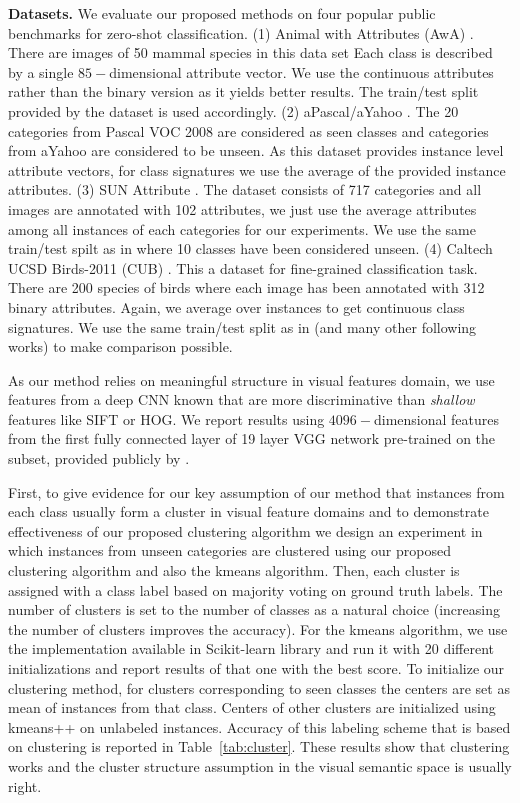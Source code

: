 \documentclass[10pt,twocolumn,letterpaper]{article}
\begin{document}
\textbf{Datasets.}
We evaluate our proposed methods on four popular public benchmarks for zero-shot classification.
(1) Animal with Attributes (AwA) \cite{lampert09}. There are images of 50 mammal species in this data set
Each class is described by a single $85-$dimensional attribute vector. We use the continuous attributes rather than
the binary version as it yields better results. The train/test split provided by the dataset is used accordingly.
(2) aPascal/aYahoo \cite{farhadi09}. The 20 categories from Pascal VOC 2008 \cite{pascal} are considered as seen classes and
categories from aYahoo are considered to be unseen. As this dataset provides instance level attribute vectors,
for class signatures we use the average of the provided instance attributes.
(3) SUN Attribute \cite{sun}. The dataset consists of 717 categories and all images are annotated with 102 attributes, we just
use the average attributes among all instances of each categories for our experiments. We use the same train/test spilt
as in \cite{jayaraman14} where 10 classes have been considered unseen.
(4) Caltech UCSD Birds-2011 (CUB) \cite{cub}. This a dataset for fine-grained classification task. There are 200 species of
birds where each image has been annotated with 312 binary attributes. Again, we average over instances to get continuous class signatures.
We use the same train/test split as in \cite{akata13} (and many other following works) to make comparison possible.

As our method relies on meaningful structure in visual features domain, we use features from a deep CNN known that are
 more discriminative than \textit{shallow} features like SIFT or HOG. We report results using
  $4096-$dimensional features from the first fully connected layer of 19 layer VGG network \cite{vgg}
pre-trained on the subset, provided publicly by \cite{sse}.

First, to give evidence for our key assumption of our method that instances from each class usually form a cluster in visual feature domains
and to demonstrate effectiveness of our proposed clustering algorithm we design an
experiment in which instances from unseen categories are clustered using our proposed clustering algorithm and also the kmeans algorithm. Then,
each cluster is assigned with a class label based on majority voting on ground truth labels. The number of clusters
 is set to the number of classes as a natural choice (increasing the number of clusters improves the accuracy).
For the kmeans algorithm, we use the implementation available in Scikit-learn library \cite{scikit-learn} and run it with 20 different initializations
and report results of that one with the best score.
To initialize our clustering method, for clusters corresponding to seen classes the centers are set as mean of instances from that class. Centers of other
clusters are initialized using kmeans++ \cite{kmeanspp} on unlabeled instances.
Accuracy of this labeling scheme that is based on clustering is reported in Table~\ref{tab:cluster}. These results show that clustering works and the cluster structure assumption in the visual semantic space is usually right.
\end{document}

